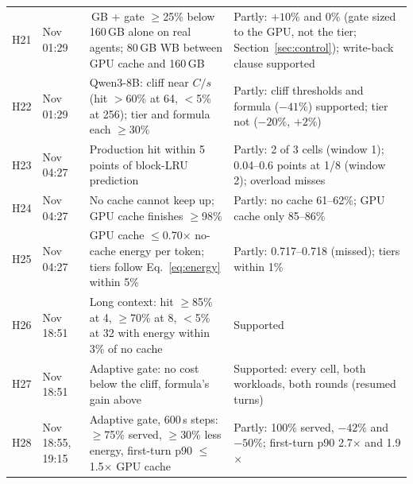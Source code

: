 \begin{table}[p]
\begin{tabular}{p{}>{\raggedright\arraybackslash}p{}>{\raggedright\arraybackslash}p{}>{\raggedright\arraybackslash}p{}}
H21 & 7 Nov 01:29 & 160\,GB + gate $\ge$25\% below 160\,GB alone on real agents; 80\,GB WB between GPU cache and 160\,GB & Partly: $+10\%$ and 0\% (gate sized to the GPU, not the tier; Section~\ref{sec:control}); write-back clause supported \\
H22 & 7 Nov 01:29 & Qwen3-8B: cliff near $C/s$ (hit $>$60\% at 64, $<$5\% at 256); tier and formula each $\ge$30\% & Partly: cliff thresholds and formula ($-41\%$) supported; tier not ($-20\%$, $+2\%$) \\
H23 & 7 Nov 04:27 & Production hit within 5 points of block-LRU prediction & Partly: 2 of 3 cells (window 1); 0.04--0.6 points at 1/8 (window 2); overload misses \\
H24 & 7 Nov 04:27 & No cache cannot keep up; GPU cache finishes $\ge$98\% & Partly: no cache 61--62\%; GPU cache only 85--86\% \\
H25 & 7 Nov 04:27 & GPU cache $\le$0.70$\times$ no-cache energy per token; tiers follow Eq.~\eqref{eq:energy} within 5\% & Partly: 0.717--0.718 (missed); tiers within 1\% \\
H26 & 7 Nov 18:51 & Long context: hit $\ge$85\% at 4, $\ge$70\% at 8, $<$5\% at 32 with energy within 3\% of no cache & Supported \\
H27 & 7 Nov 18:51 & Adaptive gate: no cost below the cliff, formula's gain above & Supported: every cell, both workloads, both rounds (resumed turns) \\
H28 & 8 Nov 18:55, 19:15 & Adaptive gate, 600\,s steps: $\ge$75\% served, $\ge$30\% less energy, first-turn p90 $\le$1.5$\times$ GPU cache & Partly: 100\% served, $-42\%$ and $-50\%$; first-turn p90 2.7$\times$ and 1.9$\times$ \\
\bottomrule
\end{tabular}
\end{table}
